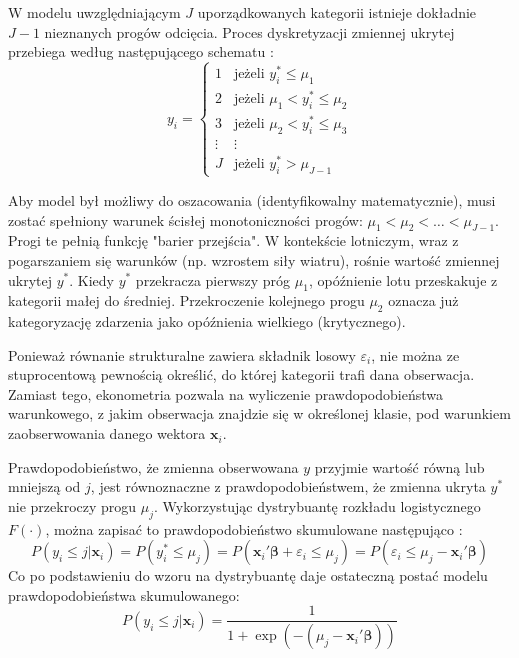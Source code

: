 W modelu uwzględniającym $J$ uporządkowanych kategorii istnieje dokładnie $J-1$ nieznanych progów odcięcia. Proces dyskretyzacji zmiennej ukrytej przebiega według następującego schematu \cite{greene2003}:
\begin{equation}
    y_i = \begin{cases} 
    1 & \text{jeżeli } y_i^* \le \mu_1 \\
    2 & \text{jeżeli } \mu_1 < y_i^* \le \mu_2 \\
    3 & \text{jeżeli } \mu_2 < y_i^* \le \mu_3 \\
    \vdots & \vdots \\
    J & \text{jeżeli } y_i^* > \mu_{J-1}
    \end{cases}
\end{equation}

Aby model był możliwy do oszacowania (identyfikowalny matematycznie), musi zostać spełniony warunek ścisłej monotoniczności progów: $\mu_1 < \mu_2 < \dots < \mu_{J-1}$. Progi te pełnią funkcję "barier przejścia". W kontekście lotniczym, wraz z pogarszaniem się warunków (np. wzrostem siły wiatru), rośnie wartość zmiennej ukrytej $y^*$. Kiedy $y^*$ przekracza pierwszy próg $\mu_1$, opóźnienie lotu przeskakuje z kategorii małej do średniej. Przekroczenie kolejnego progu $\mu_2$ oznacza już kategoryzację zdarzenia jako opóźnienia wielkiego (krytycznego).

Ponieważ równanie strukturalne zawiera składnik losowy $\varepsilon_i$, nie można ze stuprocentową pewnością określić, do której kategorii trafi dana obserwacja. Zamiast tego, ekonometria pozwala na wyliczenie prawdopodobieństwa warunkowego, z jakim obserwacja znajdzie się w określonej klasie, pod warunkiem zaobserwowania danego wektora $\mathbf{x}_i$. 

Prawdopodobieństwo, że zmienna obserwowana $y$ przyjmie wartość równą lub mniejszą od $j$, jest równoznaczne z prawdopodobieństwem, że zmienna ukryta $y^*$ nie przekroczy progu $\mu_j$. Wykorzystując dystrybuantę rozkładu logistycznego $F(\cdot)$, można zapisać to prawdopodobieństwo skumulowane następująco \cite{maddala1983}:
\begin{equation}
    P(y_i \le j | \mathbf{x}_i) = P(y_i^* \le \mu_j) = P(\mathbf{x}_i' \boldsymbol{\beta} + \varepsilon_i \le \mu_j) = P(\varepsilon_i \le \mu_j - \mathbf{x}_i' \boldsymbol{\beta})
\end{equation}
Co po podstawieniu do wzoru na dystrybuantę daje ostateczną postać modelu prawdopodobieństwa skumulowanego:
\begin{equation}
    P(y_i \le j | \mathbf{x}_i) = \frac{1}{1 + \exp(-(\mu_j - \mathbf{x}_i' \boldsymbol{\beta}))}
\end{equation}

